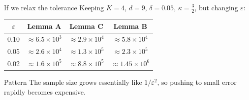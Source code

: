 \documentclass[10pt,aspectratio=169]{beamer}
\begin{document}
\begin{frame}{If we relax the tolerance}
	\small
	Keeping \(K=4\), \(d=9\), \(\delta=0.05\), \(\kappa=\tfrac32\), but changing \(\varepsilon\):

	\begin{table}
		\centering
		\begin{tabular}{c c c c}
			\hline
			\(\varepsilon\) & Lemma A                    & Lemma C                    & Lemma B                     \\
			\hline
			0.10            & \(\approx 6.5\times 10^3\) & \(\approx 2.9\times 10^4\) & \(\approx 5.8\times 10^4\)  \\
			0.05            & \(\approx 2.6\times 10^4\) & \(\approx 1.3\times 10^5\) & \(\approx 2.3\times 10^5\)  \\
			0.02            & \(\approx 1.6\times 10^5\) & \(\approx 8.8\times 10^5\) & \(\approx 1.45\times 10^6\) \\
			\hline
		\end{tabular}
	\end{table}

	\begin{block}{Pattern}
		The sample size grows essentially like \(1/\varepsilon^2\), so pushing to small error rapidly becomes expensive.
	\end{block}

\end{frame}
\end{document}
